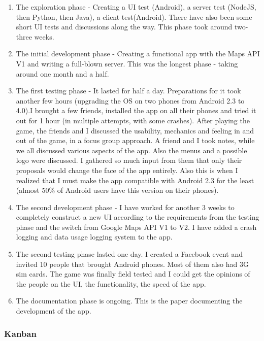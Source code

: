 \documentclass{article}
\begin{document}
\begin{enumerate}
  \item The exploration phase - Creating a UI test (Android), a server test
  (NodeJS, then Python, then Java), a client test(Android). There have also
  been some short UI tests and discussions along the way. This phase took around
  two-three weeks.
  \item The initial development phase - Creating a functional app with the Maps
  API V1 and writing a full-blown server. This was the longest phase - taking
  around one month and a half.
  \item The first testing phase - It lasted for half a day. Preparations for it
  took another few hours (upgrading the OS on two phones from Android 2.3 to
  4.0).I brought a few friends, installed the app on all their phones and tried
  it out for 1 hour (in multiple attempts, with some crashes). After playing
  the game, the friends and I discussed the usability, mechanics and feeling in
  and out of the game, in a focus group approach. A friend and I took notes,
  while we all discussed various aspects of the app. Also the menus and a
  possible logo were discussed. I gathered so much input from them that only
  their proposals would change the face of the app entirely. Also this is when I
  realized that I must make the app compatible with Android 2.3 for the least
  (almost 50\% of Android users have this version on their phones).
  \item The second development phase - I have worked for another 3 weeks to
  completely construct a new UI according to the requirements from the testing
  phase and the switch from Google Maps API V1 to V2. I have added a crash
  logging and data usage logging system to the app.
  \item The second testing phase lasted one day. I created a Facebook
  event and invited 10 people that brought Android phones. Most of them also had
  3G sim cards. The game was finally field tested and I could get the opinions
  of the people on the UI, the functionality, the speed of the app.
  \item The documentation phase is ongoing. This is the paper documenting the
  development of the app.
  
\end{enumerate}

\subsubsection{Kanban}
\end{document}
